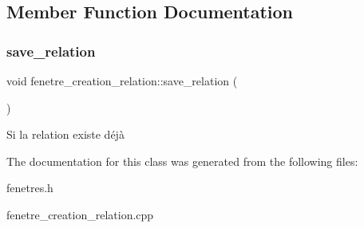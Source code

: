 \subsection{Member Function Documentation}
\mbox{\label{classfenetre__creation__relation_af9891e79cff26ef704cfdae9cfa46752}} 
\subsubsection{\texorpdfstring{save\+\_\+relation}{save\_relation}}
{\footnotesize\ttfamily void fenetre\+\_\+creation\+\_\+relation\+::save\+\_\+relation (\begin{DoxyParamCaption}{ }\end{DoxyParamCaption})\hspace{0.3cm}{\ttfamily [slot]}}

Si la relation existe déjà 

The documentation for this class was generated from the following files\+:\begin{DoxyCompactItemize}
\item 
fenetres.\+h\item 
fenetre\+\_\+creation\+\_\+relation.\+cpp\end{DoxyCompactItemize}

